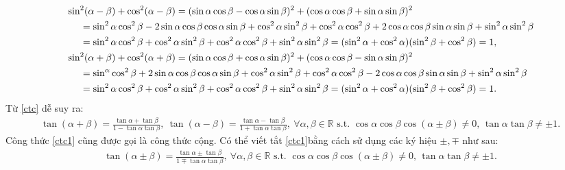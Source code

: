 \documentclass[oneside]{book}
\numberwithin{equation}{section}
\begin{document}
\begin{align*}
	&\sin^2(\alpha - \beta) + \cos^2(\alpha - \beta) = (\sin\alpha\cos\beta - \cos\alpha\sin\beta)^2 + (\cos\alpha\cos\beta + \sin\alpha\sin\beta)^2\\
	&\hspace{5mm}= \sin^2\alpha\cos^2\beta - 2\sin\alpha\cos\beta\cos\alpha\sin\beta + \cos^2\alpha\sin^2\beta + \cos^2\alpha\cos^2\beta + 2\cos\alpha\cos\beta\sin\alpha\sin\beta + \sin^2\alpha\sin^2\beta\\
	&\hspace{5mm}= \sin^2\alpha\cos^2\beta + \cos^2\alpha\sin^2\beta + \cos^2\alpha\cos^2\beta + \sin^2\alpha\sin^2\beta = (\sin^2\alpha + \cos^2\alpha)(\sin^2\beta + \cos^2\beta)  = 1,\\
	&\sin^2(\alpha + \beta) + \cos^2(\alpha + \beta) = (\sin\alpha\cos\beta + \cos\alpha\sin\beta)^2 + (\cos\alpha\cos\beta - \sin\alpha\sin\beta)^2\\
	&\hspace{5mm}= \sin^\alpha\cos^2\beta + 2\sin\alpha\cos\beta\cos\alpha\sin\beta + \cos^2\alpha\sin^2\beta + \cos^2\alpha\cos^2\beta - 2\cos\alpha\cos\beta\sin\alpha\sin\beta + \sin^2\alpha\sin^2\beta\\
	&\hspace{5mm}= \sin^2\alpha\cos^2\beta + \cos^2\alpha\sin^2\beta + \cos^2\alpha\cos^2\beta + \sin^2\alpha\sin^2\beta = (\sin^2\alpha + \cos^2\alpha)(\sin^2\beta + \cos^2\beta)  = 1.
\end{align*}
Từ \eqref{ctc} dễ suy ra:
\begin{align}
	\label{ctc1}
	\tag{ctc'}
	\boxed{\tan(\alpha + \beta) = \frac{\tan\alpha + \tan\beta}{1 - \tan\alpha\tan\beta},\ \tan(\alpha - \beta) = \frac{\tan\alpha - \tan\beta}{1 + \tan\alpha\tan\beta},\ \forall\alpha,\beta\in\mathbb{R}\mbox{ s.t. } \cos\alpha\cos\beta\cos(\alpha\pm\beta)\ne 0,\,\tan\alpha\tan\beta\ne\pm 1.}
\end{align}
Công thức \eqref{ctc1} cũng được gọi là công thức cộng. Có thể viết tắt \eqref{ctc1}bằng cách sử dụng các ký hiệu $\pm,\mp$ như sau:
\begin{align*}
	\boxed{\tan(\alpha\pm\beta) = \frac{\tan\alpha\pm\tan\beta}{1\mp\tan\alpha\tan\beta},\ \forall\alpha,\beta\in\mathbb{R}\mbox{ s.t. } \cos\alpha\cos\beta\cos(\alpha\pm\beta)\ne 0,\,\tan\alpha\tan\beta\ne\pm 1.}
\end{align*}
\end{document}
